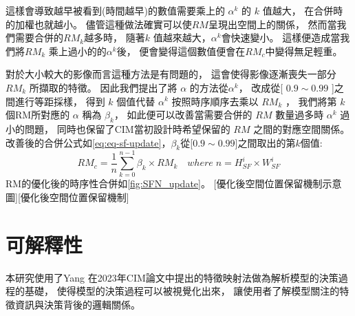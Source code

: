 \documentclass[class=NCU_thesis, crop=false]{standalone}
\begin{document}
	這樣會導致越早被看到(時間越早)的數值需要乘上的 $\alpha^{k}$ 的 $k$ 值越大，
	在合併時的加權也就越小。
	儘管這種做法確實可以使$RM$呈現出空間上的關係，
	然而當我們需要合併的$RM_{k}$越多時，
	隨著$k$ 值越來越大，$\alpha^{k}$會快速變小。
	這樣便造成當我們將$RM_{k}$ 乘上過小的的$\alpha^{k}$後，
	便會變得這個數值便會在$RM_{c}$中變得無足輕重。

	對於大小較大的影像而言這種方法是有問題的，
	這會使得影像逐漸喪失一部分$ RM_{k} $ 所擷取的特徵。
	因此我們提出了將 $\alpha$ 的方法從$\alpha^{k}$，
	改成從[ $0.9 \sim 0.99$ ]之間進行等距採樣，
	得到 $k$ 個值代替 $\alpha^{k}$ 按照時序順序去乘以 $RM_{k}$ ，
	我們將第 $k$ 個RM所對應的 $\alpha$ 稱為 $\beta_{k}$，
	如此便可以改善當需要合併的 $RM$ 數量過多時 $\alpha^{k}$ 過小的問題，
	同時也保留了CIM當初設計時希望保留的 $RM$ 之間的對應空間關係。\\
	改善後的合併公式如\cref{eq:eq-sf-update}，$\beta_{k}$從[$0.9 \sim 0.99$]之間取出的第$k$個值:\\
		\begin{equation}
		    \label{eq:eq-sf-update}
		    RM_{c}=\frac{1}{n} \sum_{k = 0}^{n-1} \beta_{k} \times RM_{k}  \quad where \; n = \textit{H}^{i}_{SF} \times \textit{W}^{i}_{SF}
		\end{equation}
	RM的優化後的時序性合併如\cref{fig:SFN_update}。
	[優化後空間位置保留機制示意圖][優化後空間位置保留機制]




\pagebreak
\section{可解釋性} 
本研究使用了Yang 在2023年CIM論文中提出的特徵映射法做為解析模型的決策過程的基礎，
使得模型的決策過程可以被視覺化出來，
讓使用者了解模型關注的特徵資訊與決策背後的邏輯關係。
	
\end{document}
